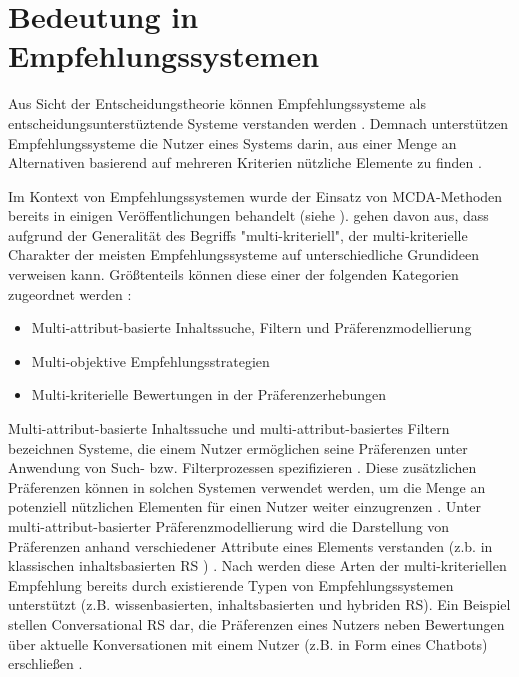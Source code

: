 \section{Bedeutung in Empfehlungssystemen}
Aus Sicht der Entscheidungstheorie \cite[S. 77]{jannach:inproceedings} können Empfehlungssysteme als entscheidungsunterstüztende Systeme verstanden werden \cite[S. 398f.]{huang:article}.
Demnach unterstützen Empfehlungssysteme die Nutzer eines Systems darin, aus einer Menge an Alternativen basierend auf mehreren Kriterien nützliche Elemente zu finden \cite[S. 398f.]{huang:article}.

Im Kontext von Empfehlungssystemen wurde der Einsatz von \ac{MCDA}-Metho\-den bereits in einigen Veröffentlichungen behandelt (siehe \cite{hdioud:inproceedings}\cite{zheng:inproceedings}\cite{adomavicius:4:inbook}\cite{adomavicius:inproceedings:2}).
\textcite[S. 849]{adomavicius:4:inbook} gehen davon aus, dass aufgrund der Generalität des Begriffs "multi-kriteriell", der multi-kriterielle Charakter \cite[S. 10]{adomavicius:5:inbook} der meisten Empfehlungssysteme auf unterschiedliche Grundideen verweisen kann.
Größtenteils können diese einer der folgenden Kategorien zugeordnet werden \cite[S. 10]{adomavicius:5:inbook}\cite[S. 849]{adomavicius:4:inbook}:
\begin{itemize}
    \item Multi-attribut-basierte Inhaltssuche, Filtern und Präferenzmodellierung
    \item Multi-objektive Empfehlungsstrategien
    \item Multi-kriterielle Bewertungen in der Präferenzerhebungen
\end{itemize}

Multi-attribut-basierte Inhaltssuche und multi-attribut-basiertes Filtern bezeichnen Systeme, die einem Nutzer ermöglichen seine Präferenzen unter Anwendung von Such- bzw. Filterprozessen spezifizieren \cite[S. 10]{adomavicius:5:inbook}\cite[S. 851]{adomavicius:4:inbook}.
Diese zusätzlichen Präferenzen können in solchen Systemen verwendet werden, um die Menge an potenziell nützlichen Elementen für einen Nutzer weiter einzugrenzen \cite[S. 11]{adomavicius:5:inbook}.
Unter multi-attribut-basierter Präferenzmodellierung wird die Darstellung von Präferenzen anhand verschiedener Attribute eines Elements verstanden (z.b. in klassischen inhaltsbasierten \ac{RS} \cite[S. 205]{hdioud:inproceedings}) \cite[S. 10]{adomavicius:5:inbook}.
Nach \textcite[S. 850]{adomavicius:4:inbook} werden diese Arten der multi-kriteriellen Empfehlung bereits durch existierende Typen von Empfehlungssystemen unterstützt (z.B. wissenbasierten, inhaltsbasierten und hybriden \ac{RS}).
Ein Beispiel stellen Conversational \ac{RS} dar, die Präferenzen eines Nutzers neben Bewertungen über aktuelle Konversationen mit einem Nutzer (z.B. in Form eines Chatbots) erschließen \cite[S. 1]{yueming:article}.

